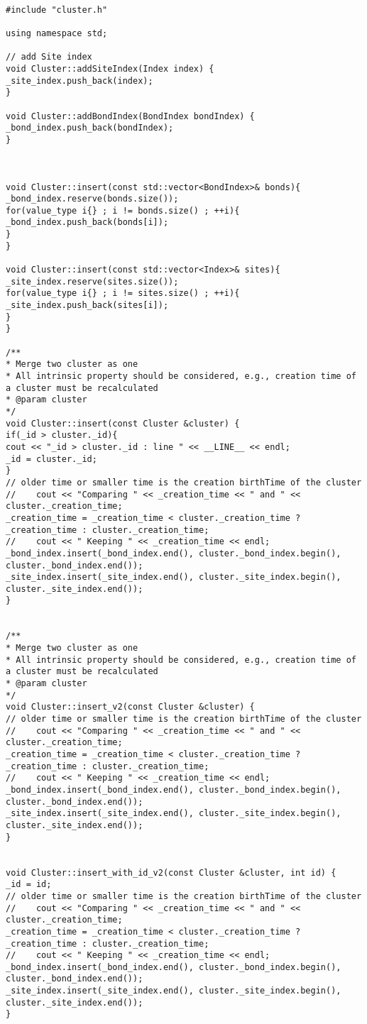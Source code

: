 \begin{lstlisting}[style=CStyle]

#include "cluster.h"

using namespace std;

// add Site index
void Cluster::addSiteIndex(Index index) {
_site_index.push_back(index);
}

void Cluster::addBondIndex(BondIndex bondIndex) {
_bond_index.push_back(bondIndex);
}



void Cluster::insert(const std::vector<BondIndex>& bonds){
_bond_index.reserve(bonds.size());
for(value_type i{} ; i != bonds.size() ; ++i){
_bond_index.push_back(bonds[i]);
}
}

void Cluster::insert(const std::vector<Index>& sites){
_site_index.reserve(sites.size());
for(value_type i{} ; i != sites.size() ; ++i){
_site_index.push_back(sites[i]);
}
}

/**
* Merge two cluster as one
* All intrinsic property should be considered, e.g., creation time of a cluster must be recalculated
* @param cluster
*/
void Cluster::insert(const Cluster &cluster) {
if(_id > cluster._id){
cout << "_id > cluster._id : line " << __LINE__ << endl;
_id = cluster._id;
}
// older time or smaller time is the creation birthTime of the cluster
//    cout << "Comparing " << _creation_time << " and " << cluster._creation_time;
_creation_time = _creation_time < cluster._creation_time ? _creation_time : cluster._creation_time;
//    cout << " Keeping " << _creation_time << endl;
_bond_index.insert(_bond_index.end(), cluster._bond_index.begin(), cluster._bond_index.end());
_site_index.insert(_site_index.end(), cluster._site_index.begin(), cluster._site_index.end());
}


/**
* Merge two cluster as one
* All intrinsic property should be considered, e.g., creation time of a cluster must be recalculated
* @param cluster
*/
void Cluster::insert_v2(const Cluster &cluster) {
// older time or smaller time is the creation birthTime of the cluster
//    cout << "Comparing " << _creation_time << " and " << cluster._creation_time;
_creation_time = _creation_time < cluster._creation_time ? _creation_time : cluster._creation_time;
//    cout << " Keeping " << _creation_time << endl;
_bond_index.insert(_bond_index.end(), cluster._bond_index.begin(), cluster._bond_index.end());
_site_index.insert(_site_index.end(), cluster._site_index.begin(), cluster._site_index.end());
}


void Cluster::insert_with_id_v2(const Cluster &cluster, int id) {
_id = id;
// older time or smaller time is the creation birthTime of the cluster
//    cout << "Comparing " << _creation_time << " and " << cluster._creation_time;
_creation_time = _creation_time < cluster._creation_time ? _creation_time : cluster._creation_time;
//    cout << " Keeping " << _creation_time << endl;
_bond_index.insert(_bond_index.end(), cluster._bond_index.begin(), cluster._bond_index.end());
_site_index.insert(_site_index.end(), cluster._site_index.begin(), cluster._site_index.end());
}



\end{lstlisting}
